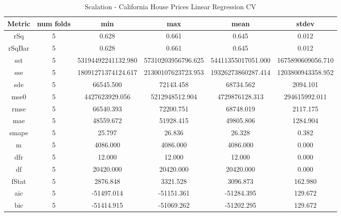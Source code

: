 \documentclass{article}
\begin{document}
\begin{table}[H]
\centering
\caption{Scalation - California House Prices Linear Regression CV}
\label{tab:Scalation - California House Prices Linear Regression CV}
\begin{tabular}{|c|c|c|c|c|c|}\hline
Metric & num folds & min & max & mean & stdev \\ \hline \hline
rSq & 5 & 0.628 & 0.661 & 0.645 & 0.012 \\ \hline
rSqBar & 5 & 0.628 & 0.661 & 0.645 & 0.012 \\ \hline
sst & 5 & 53194492241132.980 & 57310203956796.625 & 54411355017051.000 & 1675890609056.710 \\ \hline
sse & 5 & 18091271374124.617 & 21300107623723.953 & 19326273860287.414 & 1203800943358.952 \\ \hline
sde & 5 & 66545.500 & 72143.458 & 68734.562 & 2094.101 \\ \hline
mse0 & 5 & 4427623929.056 & 5212948512.904 & 4729876128.313 & 294615992.011 \\ \hline
rmse & 5 & 66540.393 & 72200.751 & 68748.019 & 2117.175 \\ \hline
mae & 5 & 48559.672 & 51928.415 & 49805.806 & 1284.904 \\ \hline
smape & 5 & 25.797 & 26.836 & 26.328 & 0.382 \\ \hline
m & 5 & 4086.000 & 4086.000 & 4086.000 & 0.000 \\ \hline
dfr & 5 & 12.000 & 12.000 & 12.000 & 0.000 \\ \hline
df & 5 & 20420.000 & 20420.000 & 20420.000 & 0.000 \\ \hline
fStat & 5 & 2876.848 & 3321.528 & 3096.873 & 162.980 \\ \hline
aic & 5 & -51497.014 & -51151.361 & -51284.395 & 129.672 \\ \hline
bic & 5 & -51414.915 & -51069.262 & -51202.295 & 129.672 \\ \hline
\end{tabular}
\end{table}
\end{document}
